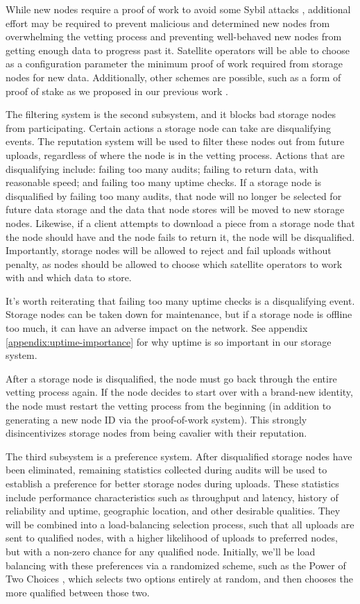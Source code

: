 \documentclass[11pt,fleqn,openany]{book}
\begin{document}
While new nodes require a proof of work to avoid some Sybil attacks
\cite{sybil-attack}, additional effort may be required to prevent
malicious and determined new nodes from overwhelming the vetting process and
preventing well-behaved new nodes from getting enough data to progress past it.
Satellite operators will be able to choose as a configuration
parameter the minimum proof of work required from storage nodes for new data.
Additionally, other schemes are possible, such as a form of proof of stake as
we proposed in our previous work \cite{sybil-cost}.

The filtering system is the second subsystem, and it blocks bad storage nodes from
participating.
Certain actions a storage node can take are disqualifying events. The
reputation system will be used to filter these nodes out from future uploads,
regardless of where the node is in the vetting process.
Actions that are disqualifying include: failing too many audits;
failing to return data, with reasonable speed; and failing too many uptime
checks.
If a storage node is disqualified by failing too many audits, that node will no
longer be selected for future data storage and the data that node stores will
be moved to new storage nodes.
Likewise, if a client attempts to download a piece from a storage node that
the node should have and the node fails to return it, the
node will be disqualified. Importantly, storage nodes will be allowed to reject
and fail uploads without penalty, as nodes should be allowed to choose which 
satellite operators to work with and which data to store.

It's worth reiterating that failing too many uptime checks is a disqualifying
event. Storage nodes can be taken down for maintenance, but if a storage node
is offline too much, it can have an adverse impact on the network. See appendix
\ref{appendix:uptime-importance} for why uptime is so important in our storage
system.

After a storage node is disqualified, the node must go back through the entire
vetting process again. If the node decides to start over with a brand-new
identity, the node must restart the vetting process from the beginning (in
addition to generating a new node ID via the proof-of-work system). This
strongly disincentivizes storage nodes from being cavalier with their
reputation.

The third subsystem is a preference system. After disqualified storage nodes
have been eliminated, remaining statistics collected during audits
will be used to establish a preference for better storage nodes during uploads.
These statistics include performance characteristics such as throughput and
latency, history of reliability and uptime, geographic location, and other
desirable qualities.
They will be combined into a load-balancing selection process, such
that all uploads are sent to qualified nodes, with a higher likelihood of
uploads to preferred nodes, but with a non-zero chance for any qualified node.
Initially, we'll be load balancing with these preferences via a randomized
scheme, such as the Power of Two Choices \cite{power-of-two-choices}, which
selects two options entirely at random, and then chooses the more qualified
between those two.
\end{document}
